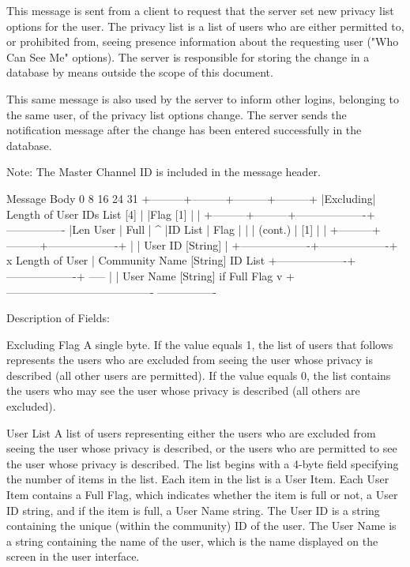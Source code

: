 \documentclass[titlepage,oneside]{book}
\begin{document}
This message is sent from a client to request that the server set new
privacy list options for the user. The privacy list is a list of users
who are either permitted to, or prohibited from, seeing presence
information about the requesting user ("Who Can See Me" options). The
server is responsible for storing the change in a database by means
outside the scope of this document.

This same message is also used by the server to inform other logins,
belonging to the same user, of the privacy list options change. The
server sends the notification message after the change has been
entered successfully in the database.

Note: The Master Channel ID is included in the message header.

Message Body
0         8         16        24      31
+---------+---------+---------+---------+
|Excluding| Length of User IDs List [4] |
|Flag [1] |                             |
+---------+---------+-------------------+  ----------------
|Len User |  Full   |                                     ^
|ID List  |  Flag   |                                     |
| (cont.) |   [1]   |                                     |
+---------+---------+-------------------+                 |
| User ID [String]                                        |
+-------------------+-------------------+      x Length of User
| Community Name [String]                           ID List
+-------------------+-------------------+  -----          |
| User Name [String]                       if Full Flag   v
+----------------------------------------  ----------------


Description of Fields:

Excluding Flag
  A single byte. If the value equals 1, the list of users that follows
  represents the users who are excluded from seeing the user whose
  privacy is described (all other users are permitted). If the value
  equals 0, the list contains the users who may see the user whose
  privacy is described (all others are excluded).

User List
  A list of users representing either the users who are excluded from
  seeing the user whose privacy is described, or the users who are
  permitted to see the user whose privacy is described. The list begins
  with a 4-byte field specifying the number of items in the list. Each
  item in the list is a User Item. Each User Item contains a Full Flag,
  which indicates whether the item is full or not, a User ID string,
  and if the item is full, a User Name string. The User ID is a string
  containing the unique (within the community) ID of the user. The User
  Name is a string containing the name of the user, which is the name
  displayed on the screen in the user interface.
\end{document}
